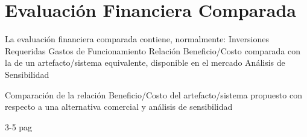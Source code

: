 \chapter{Evaluación Financiera Comparada}



La evaluación financiera comparada
contiene, normalmente:
Inversiones Requeridas
Gastos de Funcionamiento
Relación Beneficio/Costo comparada
con la de un artefacto/sistema
equivalente, disponible en el mercado
Análisis de Sensibilidad



Comparación de la relación Beneficio/Costo del
artefacto/sistema propuesto con respecto a una
alternativa comercial y análisis de sensibilidad


3-5 pag